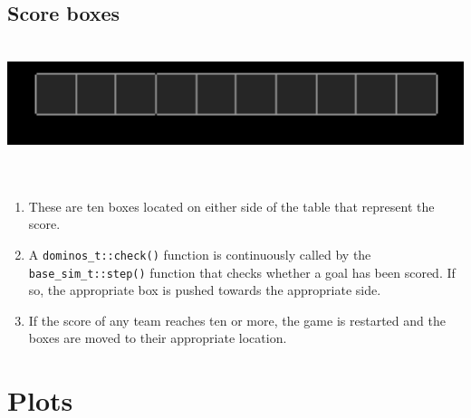 \documentclass{article}
\begin{document}
\subsection{Score boxes}
\begin{center}
\includegraphics[width=400pt,height=100pt]{Scores}~\\
\end{center}
\begin{enumerate}
\item These are ten boxes located on either side of the table that represent the score.
\item A \texttt{dominos\_t::check()} function is continuously called by the \texttt{base\_sim\_t::step()} function that checks whether a goal has been scored. If so, the appropriate box is pushed towards the appropriate side.
\item If the score of any team reaches ten or more, the game is restarted and the boxes are moved to their appropriate location.\\

\end{enumerate}



\section{Plots}
\end{document}
